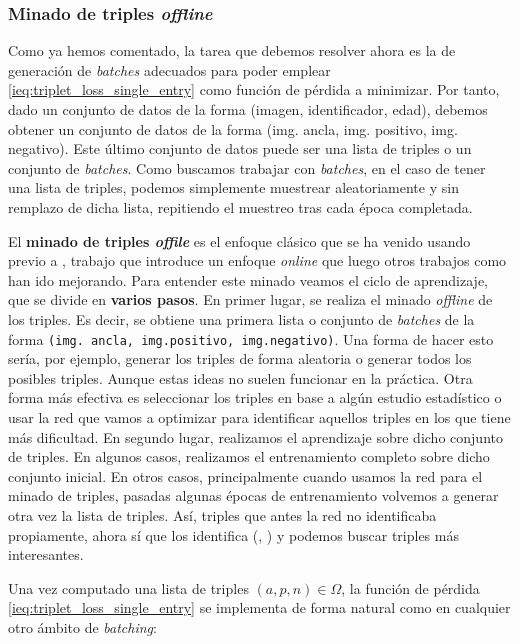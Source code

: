 \subsubsection{Minado de triples \textit{offline}} \label{isubs:enfoque_offline_minado_triples}

Como ya hemos comentado, la tarea que debemos resolver ahora es la de generación de \textit{batches} adecuados para poder emplear \eqref{ieq:triplet_loss_single_entry} como función de pérdida a minimizar. Por tanto, dado un conjunto de datos de la forma (imagen, identificador, edad), debemos obtener un conjunto de datos de la forma (img. ancla, img. positivo, img. negativo). Este último conjunto de datos puede ser una lista de triples o un conjunto de \textit{batches}. Como buscamos trabajar con \textit{batches}, en el caso de tener una lista de triples, podemos simplemente muestrear aleatoriamente y sin remplazo de dicha lista, repitiendo el muestreo tras cada época completada.

El \textbf{minado de triples \textit{offile}} es el enfoque clásico que se ha venido usando previo a \cite{informatica:facenet}, trabajo que introduce un enfoque \textit{online} que luego otros trabajos como \cite{informatica:principal} han ido mejorando. Para entender este minado veamos el ciclo de aprendizaje, que se divide en \textbf{varios pasos}. En primer lugar, se realiza el minado \textit{offline} de los triples. Es decir, se obtiene una primera lista o conjunto de \textit{batches} de la forma \lstinline{(img. ancla, img.positivo, img.negativo)}. Una forma de hacer esto sería, por ejemplo, generar los triples de forma aleatoria o generar todos los posibles triples. Aunque estas ideas no suelen funcionar en la práctica. Otra forma más efectiva es seleccionar los triples en base a algún estudio estadístico o usar la red que vamos a optimizar para identificar aquellos triples en los que tiene más dificultad. En segundo lugar, realizamos el aprendizaje sobre dicho conjunto de triples. En algunos casos, realizamos el entrenamiento completo sobre dicho conjunto inicial. En otros casos, principalmente cuando usamos la red para el minado de triples, pasadas algunas épocas de entrenamiento volvemos a generar otra vez la lista de triples. Así, triples que antes la red no identificaba propiamente, ahora sí que los identifica (, \cite{informatica:facenet}) y podemos buscar triples más interesantes.

Una vez computado una lista de triples $(a, p, n) \in \Omega$, la función de pérdida \eqref{ieq:triplet_loss_single_entry} se implementa de forma natural como en cualquier otro ámbito de \textit{batching}:

